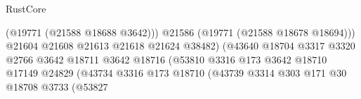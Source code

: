 \begin{lexlean}{RustCore}
\begin{coremodule}
                                                                  (@19771 (@21588 @18688 @3642)))
                                                                @21586
                                                                (@19771 (@21588 @18678 @18694)))
                                                              @21604
                                                              @21608
                                                              @21613
                                                              @21618
                                                              @21624
                                                              @38482)
                                                            (@43640
                                                              @18704
                                                              @3317
                                                              @3320
                                                              @2766
                                                              @3642
                                                              @18711
                                                              @3642
                                                              @18716
                                                              (@53810
                                                                @3316
                                                                @173
                                                                @3642
                                                                @18710
                                                                @17149
                                                                @24829
                                                                (@43734
                                                                  @3316
                                                                  @173
                                                                  @18710
                                                                  (@43739
                                                                    @3314
                                                                    @303
                                                                    @171
                                                                    @30
                                                                    @18708
                                                                    @3733
                                                                    (@53827

\end{coremodule}
\end{lexlean}
